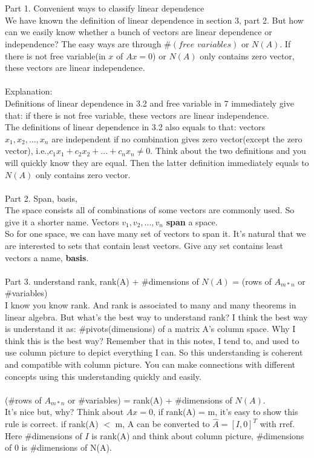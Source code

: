 \documentclass{article}
\begin{document}
\begin{spacing}{1.5}
\section{}
Part 1. Convenient ways to classify linear dependence\\
We have known the definition of linear dependence in section 3, part 2. But how can we easily know whether a bunch of vectors are linear dependence or independence? The easy ways are through $\#(free \,\,variables)$ or $N(A)$. If there is not free variable(in $x$ of $Ax=0$) or $N(A)$ only contains zero vector, these vectors are linear independence.\\
\\Explanation:\\
Definitions of linear dependence in 3.2 and free variable in 7 immediately give that: if there is not free variable, these vectors are linear independence. \\
The definitions of linear dependence in 3.2 also equals to that: vectors $x_1, x_2, ..., x_n$ are independent if no combination gives zero vector(except the zero vector), i.e.,$c_1x_1 + c_2x_2+...+c_nx_n \neq 0$. Think about the two definitions and you will quickly know they are equal. Then the latter definition immediately equals to $N(A)$ only contains zero vector.\\
\\Part 2. Span, basis, \\
The space consists all of combinations of some vectors are commonly used. So give it a shorter name. Vectors $v_1, v_2, ..., v_n$ {\bfseries span} a space. \\
So for one space, we can have many set of vectors to span it. It's natural that we are interested to sets that contain least vectors. Give any set contains least vectors a name, {\bfseries basis}.\\
\\Part 3. understand rank, rank(A) + $\#$dimensions of $N(A)$ =  (rows of $A_{m*n}$ or $\#$variables)\\
I know you know rank. And rank is associated to many and many theorems in linear algebra. But what's the best way to understand rank? I think the best way is understand it as: $\#$pivots(dimensions) of a matrix A's column space. Why I think this is the best way? Remember that in this notes, I tend to, and used to use column picture to depict everything I can. So this understanding is coherent and compatible with column picture. You can make connections with different concepts using this understanding quickly and easily. \\
\\(\#rows of $A_{m*n}$ or \#variables) = rank(A) + \#dimensions of $N(A)$. \\
It's nice but, why? Think about $Ax=0$, if rank(A) = m, it's easy to show this rule is correct. if rank(A) $<$ m, A can be converted to $\hat A=[I,0]^T$ with rref. Here \#dimensions of $I$ is rank(A) and think about column picture, \#dimensions of 0 is \#dimensions of N(A).


\section{}
\end{spacing}
\end{document}
